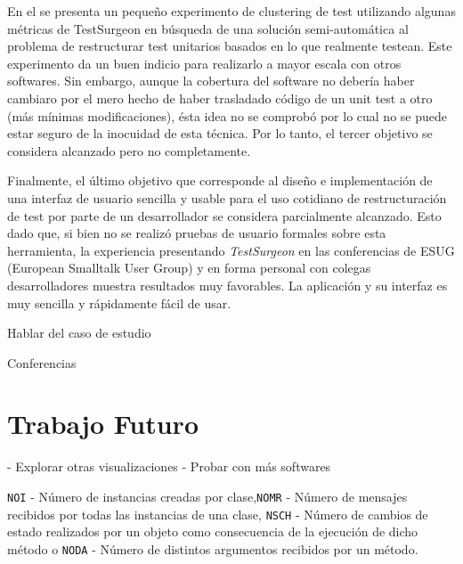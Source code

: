 \par En el  se presenta un pequeño experimento de clustering de test utilizando algunas métricas de TestSurgeon en búsqueda de una solución semi-automática al problema de restructurar test unitarios basados en lo que realmente testean. Este experimento da un buen indicio para realizarlo a mayor escala con otros softwares. Sin embargo, aunque la cobertura del software no debería haber cambiaro por el mero hecho de haber trasladado código de un unit test a otro (más mínimas modificaciones), ésta idea no se comprobó por lo cual no se puede estar seguro de la inocuidad de esta técnica. Por lo tanto, el tercer objetivo se considera alcanzado pero no completamente.

\par Finalmente, el último objetivo que corresponde al diseño e implementación de una interfaz de usuario sencilla y usable para el uso cotidiano de restructuración de test por parte de un desarrollador se considera parcialmente alcanzado. Esto dado que, si bien no se realizó pruebas de usuario formales sobre esta herramienta, la experiencia presentando \emph{TestSurgeon} en las conferencias de ESUG (European Smalltalk User Group) y en forma personal con colegas desarrolladores muestra resultados muy favorables. La aplicación y su interfaz es muy sencilla y rápidamente fácil de usar.


\par Hablar del caso de estudio

\par Conferencias 

\section{Trabajo Futuro}

- Explorar otras visualizaciones
- Probar con más softwares

{\tt NOI} - Número de instancias creadas por clase,{\tt NOMR} - Número de mensajes recibidos por todas las instancias de una clase, {\tt NSCH} - Número de cambios de estado realizados por un objeto como consecuencia de la ejecución de dicho método o {\tt NODA} - Número de distintos argumentos recibidos por un método. 

